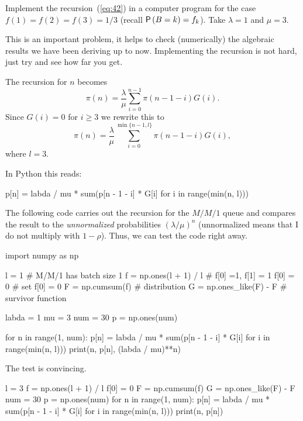 \begin{exercise}[\faCalculator]
  Implement the recursion~(\ref{eq:42}) in a computer program for the
  case $f(1)=f(2)=f(3)=1/3$ (recall $\P{B=k} =f_k$). Take $\lambda =1$
  and $\mu = 3$.  
  \begin{hint}
This is an important problem, it helps to check (numerically)
    the algebraic results we have been deriving up to
    now. Implementing the recursion is not hard, just try and see how
    far you get.
  \end{hint}
  \begin{solution}
The recursion for $n$ becomes 
\begin{equation*}
\pi(n) = \frac \lambda \mu \sum_{i=0}^{n-1} \pi(n-1-i)G(i).
\end{equation*}
Since $G(i) =0$ for $i\geq 3$ we rewrite this to 
\begin{equation*}
  \pi(n) = \frac\lambda \mu \sum_{i=0}^{\min\{n-1,l\}} \pi(n-1-i)G(i),
\end{equation*}
where $l=3$. 

In Python this reads:

\begin{pyverbatim}
p[n] = labda / mu * sum(p[n - 1 - i] * G[i] for i in range(min(n, l)))
\end{pyverbatim}

The following code carries out the recursion for the $M/M/1$ queue and compares the result to the \emph{unnormalized} probabilities $(\lambda/\mu)^n$ (unnormalized means that I do  not multiply with $1-\rho$). Thus, we can test the code right away. 

\begin{pyconsole}
import numpy as np

l = 1 # M/M/1 has batch size 1
f = np.ones(l + 1) / l # f[0] =1, f[1] = 1 
f[0] = 0 # set f[0] = 0
F = np.cumsum(f) # distribution 
G = np.ones_like(F) - F # survivor function

labda = 1
mu = 3
num = 30
p = np.ones(num)

for n in range(1, num):
    p[n] = labda / mu * sum(p[n - 1 - i] * G[i] for i in range(min(n, l)))
    print(n, p[n], (labda / mu)**n)

\end{pyconsole}
The test is convincing.

\begin{pyconsole}
l = 3
f = np.ones(l + 1) / l
f[0] = 0
F = np.cumsum(f)
G = np.ones_like(F) - F
num = 30
p = np.ones(num)
for n in range(1, num):
    p[n] = labda / mu * sum(p[n - 1 - i] * G[i] for i in range(min(n, l)))
    print(n, p[n])


\end{pyconsole}
\end{solution}
\end{exercise}
